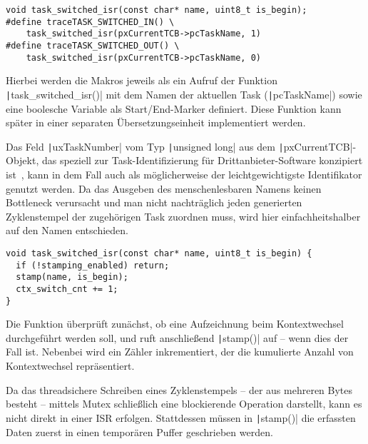 \begin{code}
\begin{verbatim}
void task_switched_isr(const char* name, uint8_t is_begin);
#define traceTASK_SWITCHED_IN() \
    task_switched_isr(pxCurrentTCB->pcTaskName, 1)
#define traceTASK_SWITCHED_OUT() \
    task_switched_isr(pxCurrentTCB->pcTaskName, 0)
\end{verbatim}
\end{code}

Hierbei werden die Makros jeweils als ein Aufruf der Funktion
\texttt|task_switched_isr()| mit dem Namen der aktuellen Task
(\texttt|pcTaskName|) sowie eine boolesche Variable als
Start/End-Marker definiert. Diese Funktion kann später in einer separaten
Übersetzungseinheit implementiert werden.

Das Feld \texttt|uxTaskNumber| vom Typ \texttt|unsigned long|
aus dem \texttt|pxCurrentTCB|-Objekt, das speziell zur
Task-Identifizierung für Drittanbieter-Software konzipiert
ist~\cite{freertos_task_c_410}, kann in dem Fall auch als möglicherweise der
leichtgewichtigste Identifikator genutzt werden. Da das Ausgeben des
menschenlesbaren Namens keinen Bottleneck verursacht und man nicht nachträglich
jeden generierten Zyklenstempel der zugehörigen Task zuordnen muss, wird hier
einfachheitshalber auf den Namen entschieden.

\begin{code}
\begin{verbatim}
void task_switched_isr(const char* name, uint8_t is_begin) {
  if (!stamping_enabled) return;
  stamp(name, is_begin);
  ctx_switch_cnt += 1;
}
\end{verbatim}
\end{code}

Die Funktion überprüft zunächst, ob eine Aufzeichnung beim Kontextwechsel
durchgeführt werden soll, und ruft anschließend \texttt|stamp()| auf --
wenn dies der Fall ist. Nebenbei wird ein Zähler inkrementiert, der die
kumulierte Anzahl von Kontextwechsel repräsentiert.

Da das threadsichere Schreiben eines Zyklenstempels -- der aus mehreren Bytes
besteht -- mittels Mutex schließlich eine blockierende Operation darstellt, kann
es nicht direkt in einer ISR erfolgen. Stattdessen müssen in
\texttt|stamp()| die erfassten Daten zuerst in einen temporären Puffer
geschrieben werden.

